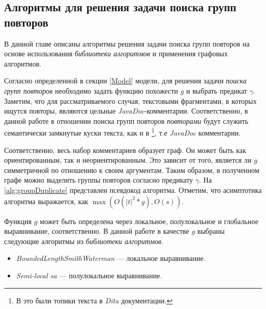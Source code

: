 

\subsection{Алгоритмы для решения задачи поиска групп повторов}\label{grouppa}
В данной главе описаны алгоритмы решения задачи поиска групп повторов на основе использования \emph{библиотеки алгоритмов} и применения графовых алгоритмов.

Согласно определенной в секции \ref{Model} модели, для решения задачи \emph{поиска групп повторов}  необходимо
задать функцию похожести $g$ и выбрать предикат $\gamma$.
Заметим, что для рассматриваемого случая, текстовыми фрагментами, в которых ищутся повторы, являются цельные \emph{JavaDoc}-комментарии.
Соответственно, в данной работе в отношении поиска групп повторов \emph{повторами} будут служить семантически замкнутые куски текста, как и в \cite{soto2015similarity}\footnote{В \cite{soto2015similarity} это были топики текста в \emph{Dita} документации.}, т.е \emph{JavaDoc} комментарии.

Соответственно, весь набор комментариев образует граф.
Он может быть как ориентированным, так и неориентированным.
Это зависит  от того, является ли $g$ симметричной по отношению к своим аргументам.
Таким образом, в полученном графе можно выделить группы повторов согласно предикату $\gamma$.
На \ref{alg:groupDuplicate} представлен псевдокод алгоритма.
Отметим, что асимптотика алгоритма выражается, как $\max (O(|t|^2*g), O(s))$.

Функция $g$ может быть определена через локальное, полулокальное и глобальное выравнивание, соответственно.
В данной работе в качестве $g$ выбраны следующие алгоритмы из \emph{библиотеки алгоритмов}.
\begin{itemize}
    \item \emph{BoundedLengthSmithWaterman} --- локальное выравнивание.
    \item \emph{Semi-local sa} --- полулокальное выравнивание.
\end{itemize}

